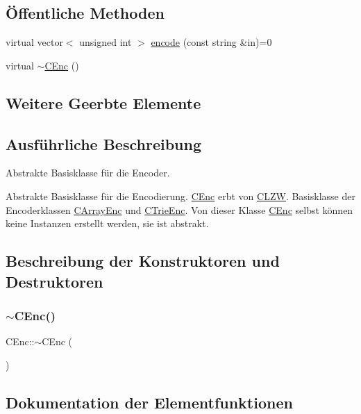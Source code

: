 \subsection*{Öffentliche Methoden}
\begin{DoxyCompactItemize}
\item 
virtual vector$<$ unsigned int $>$ \hyperlink{class_c_enc_a745a77d134a9abaaf788d47b7a235229}{encode} (const string \&in)=0
\item 
virtual \hyperlink{class_c_enc_a95603c8fc5edf44032b8f7aad8be6517}{$\sim$\+C\+Enc} ()
\end{DoxyCompactItemize}
\subsection*{Weitere Geerbte Elemente}


\subsection{Ausführliche Beschreibung}
Abstrakte Basisklasse für die Encoder. 

Abstrakte Basisklasse für die Encodierung. \hyperlink{class_c_enc}{C\+Enc} erbt von \hyperlink{class_c_l_z_w}{C\+L\+ZW}. Basisklasse der Encoderklassen \hyperlink{class_c_array_enc}{C\+Array\+Enc} und \hyperlink{class_c_trie_enc}{C\+Trie\+Enc}. Von dieser Klasse \hyperlink{class_c_enc}{C\+Enc} selbst können keine Instanzen erstellt werden, sie ist abstrakt. 

\subsection{Beschreibung der Konstruktoren und Destruktoren}
\mbox{\label{class_c_enc_a95603c8fc5edf44032b8f7aad8be6517}} 
\subsubsection{\texorpdfstring{$\sim$\+C\+Enc()}{~CEnc()}}
{\footnotesize\ttfamily C\+Enc\+::$\sim$\+C\+Enc (\begin{DoxyParamCaption}{ }\end{DoxyParamCaption})\hspace{0.3cm}{\ttfamily [virtual]}}



\subsection{Dokumentation der Elementfunktionen}
\mbox{\label{class_c_enc_a745a77d134a9abaaf788d47b7a235229}} 
